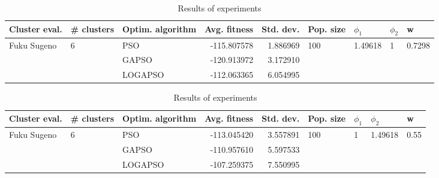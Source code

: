 \documentclass{article}
\begin{document}
\begin{table}
\centering
\caption{Results of experiments}
\begin{tabular}{lllrrllll}
\toprule
               Cluster eval. &        \# clusters & Optim. algorithm &  Avg. fitness &  Std. dev. &            Pop. size &               $\phi_{1}$ &         $\phi_{2}$ &                       w \\
\midrule
\multirow{3}{*}{Fuku Sugeno} & \multirow{3}{*}{6} &              PSO &   -115.807578 &   1.886969 & \multirow{3}{*}{100} & \multirow{3}{*}{1.49618} & \multirow{3}{*}{1} & \multirow{3}{*}{0.7298} \\
                             &                    &            GAPSO &   -120.913972 &   3.172910 &                      &                          &                    &                         \\
                             &                    &          LOGAPSO &   -112.063365 &   6.054995 &                      &                          &                    &                         \\
\bottomrule
\end{tabular}
\end{table}
\begin{table}
\centering
\caption{Results of experiments}
\begin{tabular}{lllrrllll}
\toprule
               Cluster eval. &        \# clusters & Optim. algorithm &  Avg. fitness &  Std. dev. &            Pop. size &         $\phi_{1}$ &               $\phi_{2}$ &                     w \\
\midrule
\multirow{3}{*}{Fuku Sugeno} & \multirow{3}{*}{6} &              PSO &   -113.045420 &   3.557891 & \multirow{3}{*}{100} & \multirow{3}{*}{1} & \multirow{3}{*}{1.49618} & \multirow{3}{*}{0.55} \\
                             &                    &            GAPSO &   -110.957610 &   5.597533 &                      &                    &                          &                       \\
                             &                    &          LOGAPSO &   -107.259375 &   7.550995 &                      &                    &                          &                       \\
\bottomrule
\end{tabular}
\end{table}
\end{document}
